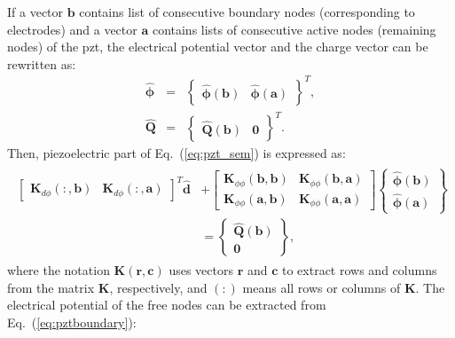 If a vector \(\textbf{b}\) contains list of consecutive boundary nodes (corresponding to electrodes) and a vector \(\textbf{a}\) contains lists of consecutive active nodes (remaining nodes) of the \ac{pzt}, the electrical potential vector and the charge vector can be rewritten as:
\begin{eqnarray}
	\widehat{\boldsymbol{\phi}} & = & \left \{\begin{array}{cc}
		\widehat{\boldsymbol{\phi}}(\textbf{b}) &
		\widehat{\boldsymbol{\phi}}(\textbf{a})
	\end{array}\right \}^T,\\
	\widehat{\textbf{Q}} & = & \left \{\begin{array}{cc}
		\widehat{\textbf{Q}}(\textbf{b}) & \textbf{0}
	\end{array}\right \}^T.
	\label{eq:phi_Q}
\end{eqnarray}
Then, piezoelectric part of Eq.~(\ref{eq:pzt_sem}) is expressed as:
\begin{eqnarray}
	\begin{split}
		\left [\begin{array}{cc}
			\textbf{K}_{d \phi}(:,\textbf{b}) &
			\textbf{K}_{d \phi}(:,\textbf{a})
		\end{array}\right]^T
		\widehat{\textbf{d}} & +
		\left [\begin{array}{cc}
			\textbf{K}_{\phi \phi}(\textbf{b},\textbf{b}) & \textbf{K}_{\phi 		\phi}(\textbf{b},\textbf{a})\\
			\textbf{K}_{\phi \phi}(\textbf{a},\textbf{b}) & \textbf{K}_{\phi \phi}(\textbf{a},\textbf{a})
		\end{array}\right]
		\left \{\begin{array}{c}
			\widehat{\boldsymbol{\phi}}(\textbf{b}) \\
			\widehat{\boldsymbol{\phi}}(\textbf{a})
		\end{array}\right \}\\ 
		& = \left \{\begin{array}{c}
			\widehat{\textbf{Q}}(\textbf{b}) \\
			\textbf{0}
		\end{array}\right \},
	\end{split}
	\label{eq:pztboundary}
\end{eqnarray}
where the notation \(\textbf{K}(\textbf{r},\textbf{c})\) uses vectors \(\textbf{r}\) and \(\textbf{c}\) to extract rows and columns from the matrix \(\textbf{K}\), respectively, and \((:)\) means all rows or columns of \(\textbf{K}\).
The electrical potential of the free nodes can be extracted from Eq.~(\ref{eq:pztboundary}):
